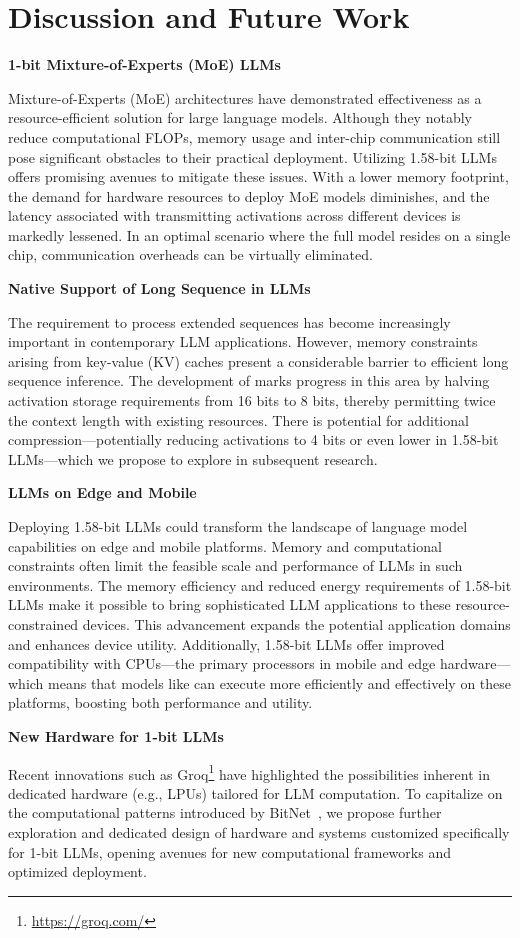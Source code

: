 \section{Discussion and Future Work}

\textbf{1-bit Mixture-of-Experts (MoE) LLMs}

Mixture-of-Experts (MoE) architectures have demonstrated effectiveness as a resource-efficient solution for large language models. Although they notably reduce computational FLOPs, memory usage and inter-chip communication still pose significant obstacles to their practical deployment. Utilizing 1.58-bit LLMs offers promising avenues to mitigate these issues. With a lower memory footprint, the demand for hardware resources to deploy MoE models diminishes, and the latency associated with transmitting activations across different devices is markedly lessened. In an optimal scenario where the full model resides on a single chip, communication overheads can be virtually eliminated.

\textbf{Native Support of Long Sequence in LLMs}

The requirement to process extended sequences has become increasingly important in contemporary LLM applications. However, memory constraints arising from key-value (KV) caches present a considerable barrier to efficient long sequence inference. The development of  marks progress in this area by halving activation storage requirements from 16 bits to 8 bits, thereby permitting twice the context length with existing resources. There is potential for additional compression—potentially reducing activations to 4 bits or even lower in 1.58-bit LLMs—which we propose to explore in subsequent research.

\textbf{LLMs on Edge and Mobile}

Deploying 1.58-bit LLMs could transform the landscape of language model capabilities on edge and mobile platforms. Memory and computational constraints often limit the feasible scale and performance of LLMs in such environments. The memory efficiency and reduced energy requirements of 1.58-bit LLMs make it possible to bring sophisticated LLM applications to these resource-constrained devices. This advancement expands the potential application domains and enhances device utility. Additionally, 1.58-bit LLMs offer improved compatibility with CPUs—the primary processors in mobile and edge hardware—which means that models like  can execute more efficiently and effectively on these platforms, boosting both performance and utility.

\textbf{New Hardware for 1-bit LLMs}

Recent innovations such as Groq\footnote{\url{https://groq.com/}} have highlighted the possibilities inherent in dedicated hardware (e.g., LPUs) tailored for LLM computation. To capitalize on the computational patterns introduced by BitNet~\cite{bitnet}, we propose further exploration and dedicated design of hardware and systems customized specifically for 1-bit LLMs, opening avenues for new computational frameworks and optimized deployment.

